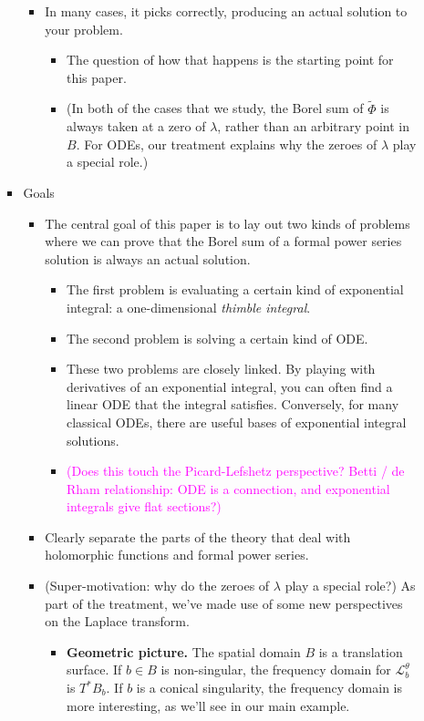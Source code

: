 \documentclass{article}
\newcommand{\laplace}{\mathcal{L}}
\begin{document}
\begin{enumerate}
\begin{itemize}
\begin{itemize}
\begin{itemize}
\item In many cases, it picks correctly, producing an actual solution to your problem.
\begin{itemize}
\item The question of how that happens is the starting point for this paper.
\item (In both of the cases that we study, the Borel sum of $\tilde{\Phi}$ is always taken at a zero of $\lambda$, rather than an arbitrary point in $B$. For ODEs, our treatment explains why the zeroes of $\lambda$ play a special role.)
\end{itemize}
\end{itemize}
\item Goals
\begin{itemize}
\item The central goal of this paper is to lay out two kinds of problems where we can prove that the Borel sum of a formal power series solution is always an actual solution.
\begin{itemize}
\item The first problem is evaluating a certain kind of exponential integral: a one-dimensional {\em thimble integral}.
\item The second problem is solving a certain kind of ODE.
\item These two problems are closely linked. By playing with derivatives of an exponential integral, you can often find a linear ODE that the integral satisfies. Conversely, for many classical ODEs, there are useful bases of exponential integral solutions.
\item \textcolor{magenta}{(Does this touch the Picard-Lefshetz perspective? Betti / de Rham relationship: ODE is a connection, and exponential integrals give flat sections?)}
\end{itemize}
\item Clearly separate the parts of the theory that deal with holomorphic functions and formal power series.
\item (Super-motivation: why do the zeroes of $\lambda$ play a special role?) As part of the treatment, we've made use of some new perspectives on the Laplace transform.
\begin{itemize}
\item \textbf{Geometric picture.} The spatial domain $B$ is a translation surface. If $b \in B$ is non-singular, the frequency domain for $\laplace_b^\theta$ is $T^* B_b$. If $b$ is a conical singularity, the frequency domain is more interesting, as we'll see in our main example.

\end{itemize}
\end{itemize}
\end{itemize}
\end{itemize}
\end{enumerate}
\end{document}
